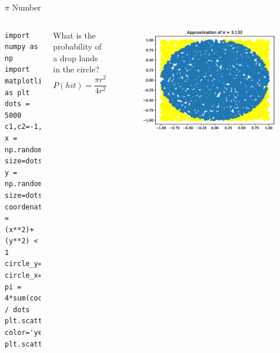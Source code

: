 \documentclass{beamer}
\begin{document}
\begin{frame}[fragile]{$\pi$ Number}

\begin{columns}


\begin{lstlisting}
import numpy as np
import matplotlib.pyplot as plt
dots = 5000
c1,c2=-1,1
x = np.random.uniform(c1,c2, size=dots)
y = np.random.uniform(c1,c2, size=dots)
coordenates_circle = (x**2)+(y**2) < 1
circle_y=y[coordenates_circle]
circle_x=x[coordenates_circle]
pi = 4*sum(coordenates_circle) / dots
plt.scatter(x,y, color='yellow')
plt.scatter(circle_x,circle_y)
\end{lstlisting}

What is the probability of a drop lands in the circle?
\begin{equation}
P(hit) = \frac{\pi r^{2}}{4r^{2}}
\end{equation}
\begin{figure}
\centerline{\includegraphics[scale=0.4]{./graphs/PiOne.eps}}
\label{fig}
\end{figure}
\end{columns}
\end{frame}
\end{document}
